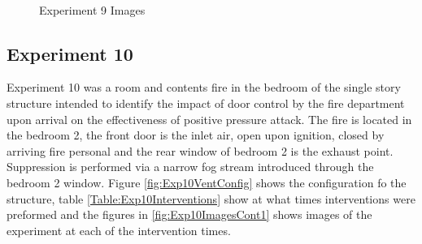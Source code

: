 \documentclass{article}
\begin{document}
\begin{figure}[H]
	\ContinuedFloat 
	\centering 
	 \ 
	 \ 
	 \ 
	\caption{Experiment 9 Images}
	\label{fig:Experiment9ImagesCont3} 
\end{figure}

\subsection{Experiment 10}
Experiment 10 was a room and contents fire in the bedroom of the single story structure intended to identify the impact of door control by the fire department upon arrival on the effectiveness of positive pressure attack. The fire is located in the bedroom 2, the front door is the inlet air, open upon ignition, closed by arriving fire personal and the rear window of bedroom 2 is the exhaust point. Suppression is performed via a narrow fog stream introduced through the bedroom 2 window. Figure \ref{fig:Exp10VentConfig} shows the configuration fo the structure, table \ref{Table:Exp10Interventions} show at what times interventions were preformed and the figures in \ref{fig:Exp10ImagesCont1} shows images of the experiment at each of the intervention times.
\end{document}
